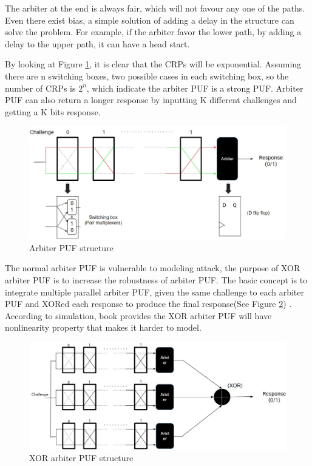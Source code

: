 The arbiter at the end is always fair, which will not favour any one of the paths. Even there exist bias, a simple solution of adding a delay in the structure can solve the problem. For example, if the arbiter favor the lower path,
by adding a delay to the upper path, it can have a head start. 

By looking at Figure \ref{fig:figure6}, it is clear that the CRPs will be exponential. Assuming there are n switching boxes, two possible cases in each switching box, so the 
number of CRPs is $2^{n}$, which indicate the arbiter PUF is a strong PUF. Arbiter PUF can also return a longer response by inputting K different challenges and getting a K bits response.

\begin{figure}[htp]
    \centering
    \includegraphics[width=18cm]{figures/figure6.jpg}
    \caption{Arbiter PUF structure}
    \label{fig:figure6}
    \end{figure}

The normal arbiter PUF is vulnerable to modeling attack, the purpose of XOR arbiter PUF is to increase the robustness of arbiter PUF. The basic concept is to integrate multiple parallel arbiter PUF, given the same challenge to each arbiter PUF and XORed each response to produce the final response(See Figure \ref{fig:figure7}) \cite{Reference5}.
According to simulation, book \cite{Reference4} provides the XOR arbiter PUF will have nonlinearity property that makes it harder to model.

\begin{figure}[htp]
    \centering
    \includegraphics[width=18cm]{figures/figure7.jpg}
    \caption{XOR arbiter PUF structure}
    \label{fig:figure7}
    \end{figure}

